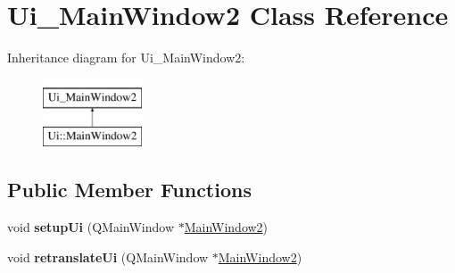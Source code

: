 \hypertarget{classUi__MainWindow2}{\section{Ui\-\_\-\-Main\-Window2 Class Reference}
\label{classUi__MainWindow2}
}
Inheritance diagram for Ui\-\_\-\-Main\-Window2\-:\begin{figure}[H]
\begin{center}
\leavevmode
\includegraphics[height=2.000000cm]{classUi__MainWindow2}
\end{center}
\end{figure}
\subsection*{Public Member Functions}
\begin{DoxyCompactItemize}
\item 
\hypertarget{classUi__MainWindow2_a1db9711210b0e82f1c951c8df384457a}{void {\bfseries setup\-Ui} (Q\-Main\-Window $\ast$\hyperlink{classMainWindow2}{Main\-Window2})}\label{classUi__MainWindow2_a1db9711210b0e82f1c951c8df384457a}

\item 
\hypertarget{classUi__MainWindow2_a4adf0db5838d6e68a601f494c2542371}{void {\bfseries retranslate\-Ui} (Q\-Main\-Window $\ast$\hyperlink{classMainWindow2}{Main\-Window2})}\label{classUi__MainWindow2_a4adf0db5838d6e68a601f494c2542371}

\end{DoxyCompactItemize}
